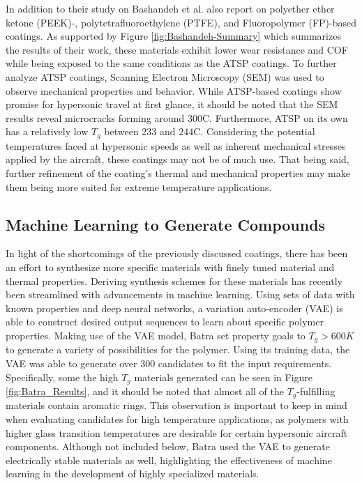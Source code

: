 \documentclass[12pt]{article}
\begin{document}
\begin{multicols}{2}
\indent In addition to their study on Bashandeh et al. also report on polyether ether ketone (PEEK)-, polytetrafluoroethylene (PTFE), and Fluoropolymer (FP)-based coatings. As supported by Figure \ref{fig:Bashandeh-Summary} which summarizes the results of their work, these materials exhibit lower wear resistance and COF while being exposed to the same conditions as the ATSP coatings. To further analyze ATSP coatings, Scanning Electron Microscopy (SEM) was used to observe mechanical properties and behavior. While ATSP-based coatings show promise for hypersonic travel at first glance, it should be noted that the SEM results reveal microcracks forming around 300\degree C. Furthermore, ATSP on its own has a relatively low $T_g$ between $233$ and $244$\degree C. Considering the potential temperatures faced at hypersonic speeds as well as inherent mechanical stresses applied by the aircraft, these coatings may not be of much use. That being said, further refinement of the coating's thermal and mechanical properties  may make them being more suited for extreme temperature applications. 

\subsection{Machine Learning to Generate Compounds}

\indent In light of the shortcomings of the previously discussed coatings, there has been an effort to synthesize more specific materials with finely tuned material and thermal properties. Deriving synthesis schemes for these materials has recently been streamlined with advancements in machine learning. Using sets of data with known properties and deep neural networks, a variation auto-encoder (VAE) is able to construct desired output sequences to learn about specific polymer properties. \citep{Batra2020} Making use of the VAE model, Batra set property goals to $T_g>600K$ to generate a variety of possibilities for the polymer. Using its training data, the VAE was able to generate over 300 candidates to fit the input requirements. Specifically, some the high $T_g$ materials generated can be seen in Figure \ref{fig:Batra_Results}, and it should be noted that almost all of the $T_g$-fulfilling materials contain aromatic rings. This observation is important to keep in mind when evaluating candidates for high temperature applications, as polymers with higher glass transition temperatures are desirable for certain hypersonic aircraft components. Although not included below, Batra used the VAE to generate electrically stable materials as well, highlighting the effectiveness of machine learning in the development of highly specialized materials.


\end{multicols}
\end{document}
